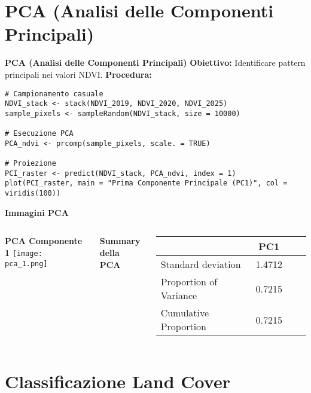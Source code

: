 \documentclass{beamer}
\begin{document}
\section{PCA (Analisi delle Componenti Principali)}

\begin{frame}[fragile]{\textbf{PCA (Analisi delle Componenti Principali)}}
\textbf{Obiettivo:} Identificare pattern principali nei valori NDVI.
\newline
\newline
\textbf{Procedura:}
\begin{lstlisting}
# Campionamento casuale
NDVI_stack <- stack(NDVI_2019, NDVI_2020, NDVI_2025)
sample_pixels <- sampleRandom(NDVI_stack, size = 10000)

# Esecuzione PCA
PCA_ndvi <- prcomp(sample_pixels, scale. = TRUE)

# Proiezione
PCI_raster <- predict(NDVI_stack, PCA_ndvi, index = 1)
plot(PCI_raster, main = "Prima Componente Principale (PC1)", col = viridis(100))
\end{lstlisting}
\end{frame}

\begin{frame}{\textbf{Immagini PCA}}
\begin{columns}
    \centering
    \textbf{PCA Componente 1}
    \texttt{[image: pca\_1.png]}
    
    \centering
    \textbf{Summary della PCA}
    \begin{table}
        \centering
        \begin{tabular}{lccc}
            \toprule
            & PC1 \\
            \midrule
            Standard deviation     & 1.4712\\
            Proportion of Variance & 0.7215\\
            Cumulative Proportion  & 0.7215\\
            \bottomrule
        \end{tabular}
    \end{table}
\end{columns}
\end{frame}

\section{Classificazione Land Cover}
\end{document}
